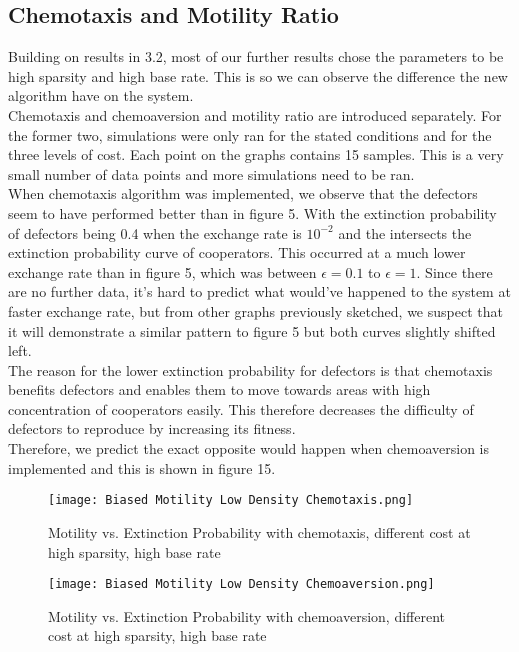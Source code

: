 \documentclass[11pt]{article}
\begin{document}
\subsection{Chemotaxis and Motility Ratio}
Building on results in 3.2, most of our further results chose the parameters to be high sparsity and high base rate. This is so we can observe the difference the new algorithm have on the system.\\
Chemotaxis and chemoaversion and motility ratio are introduced separately. For the former two, simulations were only ran for the stated conditions and for the three levels of cost. Each point on the graphs contains 15 samples. This is a very small number of data points and more simulations need to be ran.\\
When chemotaxis algorithm was implemented, we observe that the defectors seem to have performed better than in figure 5. With the extinction probability of defectors being 0.4 when the exchange rate is $10^{-2}$ and the intersects the extinction probability curve of cooperators. This occurred at a much lower exchange rate than in figure 5, which was between $\epsilon=0.1$ to $\epsilon=1$. Since there are no further data, it's hard to predict what would've happened to the system at faster exchange rate, but from other graphs previously sketched, we suspect that it will demonstrate a similar pattern to figure 5 but both curves slightly shifted left.\\
The reason for the lower extinction probability for defectors is that chemotaxis benefits defectors and enables them to move towards areas with high concentration of cooperators easily. This therefore decreases the difficulty of defectors to reproduce by increasing its fitness.\\
Therefore, we predict the exact opposite would happen when chemoaversion is implemented and this is shown in figure 15.\\
\begin{figure}[H]
    \centering
    \texttt{[image: Biased Motility Low Density Chemotaxis.png]}
    \caption{Motility vs. Extinction Probability with chemotaxis, different cost at high sparsity, high base rate}
\end{figure}
\begin{figure}[H]
    \centering
    \texttt{[image: Biased Motility Low Density Chemoaversion.png]}
    \caption{Motility vs. Extinction Probability with chemoaversion, different cost at high sparsity, high base rate}
\end{figure}
\end{document}
